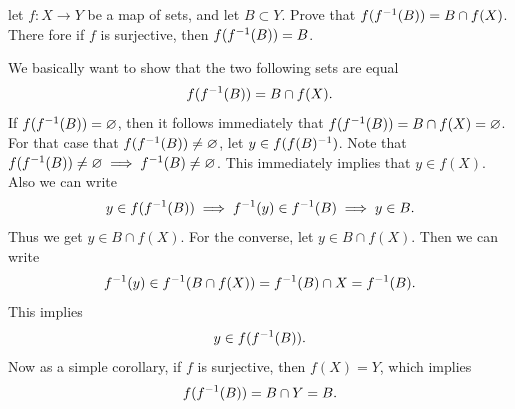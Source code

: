\begin{problem}
	let $ f: X\to Y $ be a map of sets, and let $ B \subset Y $. Prove that $ f(f^{-1}(B)) = B \cap f(X) $. There fore if $ f $ is surjective, then $ f(f^{-1}(B)) = B $.
\end{problem}
\begin{solution}
	We basically want to show that the two following sets are equal
	\[ f(f^{-1}(B)) = B \cap f(X). \]
	If $ f(f^{-1}(B)) = \varnothing $, then it follows immediately that $  f(f^{-1}(B)) = B \cap f(X) = \varnothing $. For that case that $ f(f^{-1}(B)) \neq \varnothing $, let $ y \in f(f(B)^{-1}) $. Note that $ f(f^{-1}(B)) \neq \varnothing \implies  f^{-1}(B) \neq \varnothing $. This immediately implies that $ y \in f(X) $. Also we can write
	\[ y \in f(f^{-1}(B)) \implies f^{-1}(y) \in f^{-1}(B) \implies y \in B.  \]
	Thus we get $ y \in B\cap f(X) $. For the converse, let $ y \in B\cap f(X) $. Then we can write
	\[ f^{-1}(y) \in f^{-1}(B\cap f(X)) = f^{-1}(B) \cap X = f^{-1}(B). \]
	This implies
	\[  y \in f(f^{-1}(B)).  \]
	Now as a simple corollary, if $ f $ is surjective, then $ f(X) = Y $, which implies 
	\[ f(f^{-1}(B)) = B \cap Y = B. \]
\end{solution}


